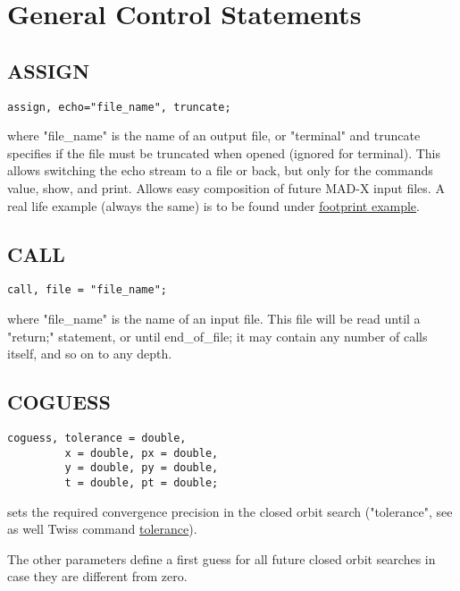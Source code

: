 
\section{General Control Statements}

\subsection{ASSIGN}
\begin{verbatim}
assign, echo="file_name", truncate;
\end{verbatim} 
where "file\_name" is the name of an output file, or "terminal" and
truncate specifies if the file must be truncated when opened (ignored
for terminal). This allows switching the echo stream to a file or back,
but only for the commands value, show, and print. Allows easy
composition of future MAD-X input files. A real life example (always the
same) is to be found under \href{foot.html}{footprint example}.  

\subsection{CALL}
\begin{verbatim}
call, file = "file_name";
\end{verbatim} 
where "file\_name"  is the name of an input file. This file will be read
until a "return;" statement, or until end\_of\_file; it may contain any
number of calls itself, and so on to any depth.  

\subsection{COGUESS}
\label{subsec:general_coguess}
\begin{verbatim}
coguess, tolerance = double, 
         x = double, px = double, 
         y = double, py = double, 
         t = double, pt = double;
\end{verbatim} 
sets the required convergence precision in the closed orbit search
("tolerance", see as well Twiss command
\href{../twiss/twiss.html#tolerance}{tolerance}).  

The other parameters define a first guess for all future closed orbit
searches in case they are different from zero.  


